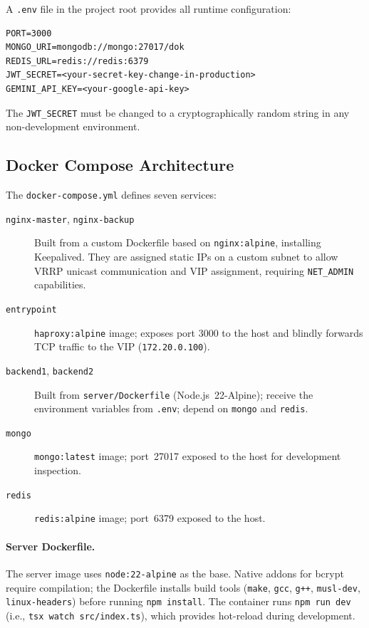 \documentclass{scrartcl}
\begin{document}
  A \texttt{.env} file in the project root provides all runtime configuration:

  \begin{verbatim}
PORT=3000
MONGO_URI=mongodb://mongo:27017/dok
REDIS_URL=redis://redis:6379
JWT_SECRET=<your-secret-key-change-in-production>
GEMINI_API_KEY=<your-google-api-key>
  \end{verbatim}

  The \texttt{JWT\_SECRET} must be changed to a cryptographically random string in any
  non-development environment.

  \subsection{Docker Compose Architecture}

  The \texttt{docker-compose.yml} defines seven services:

  \begin{description}
    \item[\texttt{nginx-master}, \texttt{nginx-backup}]
    Built from a custom Dockerfile based on \texttt{nginx:alpine}, installing Keepalived.
    They are assigned static IPs on a custom subnet to allow VRRP unicast communication and VIP assignment,
    requiring \texttt{NET\_ADMIN} capabilities.
    \item[\texttt{entrypoint}] \texttt{haproxy:alpine} image; exposes port 3000 to the host and blindly forwards TCP traffic to the VIP (\texttt{172.20.0.100}).
    \item[\texttt{backend1}, \texttt{backend2}] Built from \texttt{server/Dockerfile}
    (Node.js~22-Alpine); receive the environment variables from \texttt{.env}; depend on
    \texttt{mongo} and \texttt{redis}.
    \item[\texttt{mongo}] \texttt{mongo:latest} image; port~27017 exposed to the host for
    development inspection.
    \item[\texttt{redis}] \texttt{redis:alpine} image; port~6379 exposed to the host.
  \end{description}

  \paragraph{Server Dockerfile.}
  The server image uses \texttt{node:22-alpine} as the base. Native addons for bcrypt require
  compilation; the Dockerfile installs build tools (\texttt{make}, \texttt{gcc}, \texttt{g++},
  \texttt{musl-dev}, \texttt{linux-headers}) before running \texttt{npm install}. The
  container runs \texttt{npm run dev} (i.e., \texttt{tsx watch src/index.ts}), which provides
  hot-reload during development.
\end{document}
